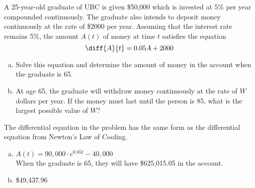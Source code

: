 \begin{Mquestion}[1997D]
  A 25-year-old graduate of UBC is given \$50,000 which is invested
at 5\% per year compounded continuously. The graduate also intends to
deposit money continuously at the rate of \$2000 per year. Assuming that
the interest rate remains 5\%, the amount $A(t)$ of money at time $t$ satisfies
the equation
$$
\diff{A}{t}= 0.05 A+2000
$$
\begin{enumerate}[(a)]
\item Solve this equation and determine the amount of money in the account when the graduate
is 65.
\item At age 65, the graduate will withdraw money continuously
at the rate of $W$ dollars per year. If the money must last until the person
is 85, what is the largest possible value of $W$?
\end{enumerate}
\end{Mquestion}
\begin{hint}
The differential equation in the problem has the same form as the differential equation from Newton's Law of Cooling.
\end{hint}
\begin{answer}
\begin{enumerate}[(a)]
\item $A(t)=90,\!000\cdot e^{0.05t}-40,\!000$ \\
When the graduate is 65, they will have \$625,015.05 in the account.
\item \$49,437.96
\end{enumerate}
\end{answer}
